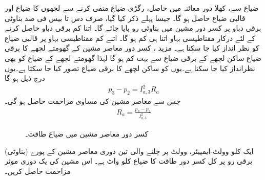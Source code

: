 ضیاع  سے، کھلا دور معائنہ میں حاصل، رگڑی ضیاع  منفی کرنے سے لچھوں کا ضیاع اور قالبی ضیاع حاصل ہو گا۔ جیسا پہلے ذکر کیا گیا، صرف دس تا بیس فی صد بناوٹی برقی دباو پر کسر دور مشین میں بناوٹی رو پایا جائے گا۔ اتنا کم برقی دباو حاصل کرنے کے لئے درکار مقناطیسی بہاو اتنا ہی کم ہو گا۔ اتنے کم مقناطیسی بہاو پر قالبی ضیاع کو نظر انداز کیا جا سکتا ہے۔ مزید ، کسر دور معاصر مشین کے گھومتے لچھے کا برقی ضیاع ساکن لچھے کے برقی ضیاع سے بہت کم ہو گا لہٰذا  گھومتے لچھے کے ضیاع کو بھی نظرانداز کیا جا سکتا ہے۔یوں  کو ساکن لچھے کا برقی ضیاع تصور کیا جا سکتا ہے۔یوں درج ذیل ہو گا
\begin{align*}
p_3-p_2=I_{a,3}^2 R_a
\end{align*}
جس  سے معاصر مشین کی مساوی مزاحمت حاصل ہو گی۔
\begin{align}
R_a=\frac{p_3-p_2}{I_{a,3}^2}
\end{align}
%
\begin{figure}
\centering
\caption{کسر دور معاصر مشین میں ضیاع طاقت۔}
\label{شکل_معاصر_کسر_دور_ضیاع}
\end{figure}
ایک   کلو وولٹ-ایمپیئر،   وولٹ پر چلنے والی تین دوری معاصر مشین کے پورے (بناوٹی) برقی رو پر  کل کسر دور طاقت کا ضیاع   کلو واٹ ہے۔ اس مشین کی یک دوری موثر مزاحمت حاصل کریں۔

